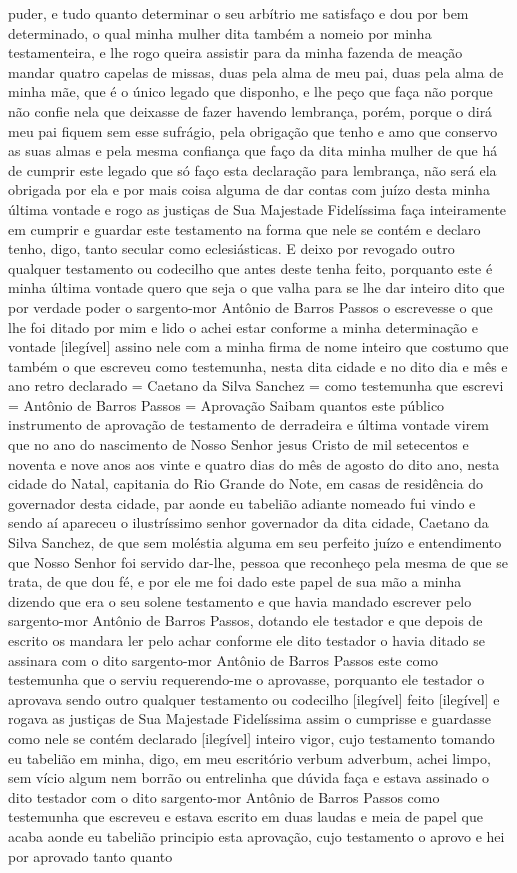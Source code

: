 \begin{refsection}
puder, e tudo quanto determinar o seu arbítrio me satisfaço e dou por bem determinado, o qual minha mulher dita também a nomeio por minha testamenteira, e lhe rogo queira assistir para da minha fazenda de meação mandar quatro capelas de missas, duas pela alma de meu pai, duas pela alma de minha mãe, que é o único legado que disponho, e lhe peço que faça não porque não confie nela que deixasse de fazer havendo lembrança, porém, porque o dirá meu pai fiquem sem esse sufrágio, pela obrigação que tenho e amo que conservo as suas almas e pela mesma confiança que faço da dita minha mulher de que há de cumprir este legado que só faço esta declaração para lembrança, não será ela obrigada por ela e por mais coisa alguma de dar contas com juízo desta minha última vontade e rogo as justiças de Sua Majestade Fidelíssima faça inteiramente em cumprir e guardar este testamento na forma que nele se contém e declaro tenho, digo, tanto secular como eclesiásticas. E deixo por revogado outro qualquer testamento ou codecilho que antes deste tenha feito, porquanto este é minha última vontade quero que seja o que valha para se lhe dar inteiro dito que por verdade poder o sargento-mor Antônio de Barros Passos o escrevesse o que lhe foi ditado por mim e lido o achei estar conforme a minha determinação e vontade [ilegível] assino nele com a minha firma de nome inteiro que costumo que também o que escreveu como testemunha, nesta dita cidade e no dito dia e mês e ano retro declarado = Caetano da Silva Sanchez = como testemunha que escrevi = Antônio de Barros Passos = Aprovação Saibam quantos este público instrumento de aprovação de testamento de derradeira e última vontade virem que no ano do nascimento de Nosso Senhor jesus Cristo de mil setecentos e noventa e nove anos aos vinte e quatro dias do mês de agosto do dito ano, nesta cidade do Natal, capitania do Rio Grande do Note, em casas de residência do governador desta cidade, par aonde eu tabelião adiante nomeado fui vindo e sendo aí apareceu o ilustríssimo senhor governador da dita cidade, Caetano da Silva Sanchez, de que sem moléstia alguma em seu perfeito juízo e entendimento que Nosso Senhor foi servido dar-lhe, pessoa que reconheço pela mesma de que se trata, de que dou fé, e por ele me foi dado este papel de sua mão a minha dizendo que era o seu solene testamento e que havia mandado escrever pelo sargento-mor Antônio de Barros Passos, dotando ele testador e que depois de escrito os mandara ler pelo achar conforme ele dito testador o havia ditado se assinara com o dito sargento-mor Antônio de Barros Passos este como testemunha que o serviu requerendo-me o aprovasse, porquanto ele testador o aprovava sendo outro qualquer testamento ou codecilho [ilegível] feito [ilegível] e rogava as justiças de Sua Majestade Fidelíssima assim o cumprisse e guardasse como nele se contém declarado [ilegível] inteiro vigor, cujo testamento tomando eu tabelião em minha, digo, em meu escritório verbum adverbum, achei limpo, sem vício algum nem borrão ou entrelinha que dúvida faça e estava assinado o dito testador com o dito sargento-mor Antônio de Barros Passos como testemunha que escreveu e estava escrito em duas laudas e meia de papel que acaba aonde eu tabelião principio esta aprovação, cujo testamento o aprovo e hei por aprovado tanto quanto 
\end{refsection}
